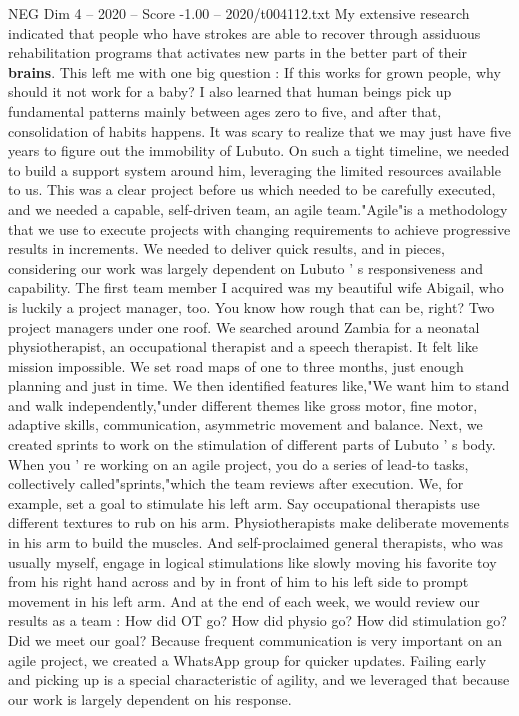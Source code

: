 \begin{textsample}{NEG Dim 4 – 2020 – Score -1.00 – 2020/t004112.txt}
My extensive research indicated that people who have strokes are able to recover through assiduous rehabilitation programs that activates new parts in the better part of their \textbf{brains}.
This left me with one big question : If this works for grown people, why should it not work for a baby?
I also learned that human beings pick up fundamental patterns mainly between ages zero to five, and after that, consolidation of habits happens.
It was scary to realize that we may just have five years to figure out the immobility of Lubuto.
On such a tight timeline, we needed to build a support system around him, leveraging the limited resources available to us.
This was a clear project before us which needed to be carefully executed, and we needed a capable, self-driven team, an agile team."Agile"is a methodology that we use to execute projects with changing requirements to achieve progressive results in increments.
We needed to deliver quick results, and in pieces, considering our work was largely dependent on Lubuto ' s responsiveness and capability.
The first team member I acquired was my beautiful wife Abigail, who is luckily a project manager, too.
You know how rough that can be, right?
Two project managers under one roof.
We searched around Zambia for a neonatal physiotherapist, an occupational therapist and a speech therapist.
It felt like mission impossible.
We set road maps of one to three months, just enough planning and just in time.
We then identified features like,"We want him to stand and walk independently,"under different themes like gross motor, fine motor, adaptive skills, communication, asymmetric movement and balance.
Next, we created sprints to work on the stimulation of different parts of Lubuto ' s body.
When you ' re working on an agile project, you do a series of lead-to tasks, collectively called"sprints,"which the team reviews after execution.
We, for example, set a goal to stimulate his left arm.
Say occupational therapists use different textures to rub on his arm.
Physiotherapists make deliberate movements in his arm to build the muscles.
And self-proclaimed general therapists, who was usually myself, engage in logical stimulations like slowly moving his favorite toy from his right hand across and by in front of him to his left side to prompt movement in his left arm.
And at the end of each week, we would review our results as a team : How did OT go?
How did physio go?
How did stimulation go?
Did we meet our goal?
Because frequent communication is very important on an agile project, we created a WhatsApp group for quicker updates.
Failing early and picking up is a special characteristic of agility, and we leveraged that because our work is largely dependent on his response.

\end{textsample}
